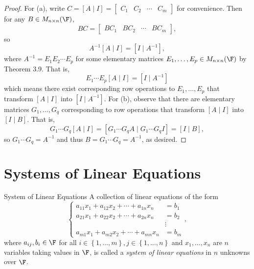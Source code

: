 \documentclass[linearalgebraI]{subfiles}
\begin{document}
    \begin{proof}
        For (a), write $C = [A\mid I] = \begin{bmatrix} C_1 & C_2 & \cdots & C_m \end{bmatrix}$ for convenience. Then for any $B\in M_{n\times n}(\F)$,
        \begin{equation*}
            BC = 
            \begin{bmatrix}
                BC_1 & BC_2 & \cdots & BC_m
            \end{bmatrix},
        \end{equation*}
        so
        \begin{equation*}
            A^{-1}[A\mid I] = [I\mid A^{-1}],
        \end{equation*}
        where $A^{-1} = E_1E_2\cdots E_p$ for some elementary matrices $E_1, \ldots, E_p\in M_{n\times n}(\F)$ by Theorem 3.9. That is,
        \begin{equation*}
            E_1\cdots E_p [A\mid I] = [I\mid A^{-1}]
        \end{equation*}
        which means there exist corresponding row operations to $E_1, \ldots, E_p$ that transform $[A\mid I]$ into $[I\mid A^{-1}]$. For (b), observe that there are elementary matrices $G_1, \ldots, G_q$ corresponding to row operations that transform $[A\mid I]$ into $[I\mid B]$. That is,
        \begin{equation*}
            G_1\cdots G_q [A\mid I] = [G_1\cdots G_qA\mid G_1\cdots G_qI] = [I\mid B],
        \end{equation*}
        so $G_1\cdots G_q = A^{-1}$ and thus $B = G_1\cdots G_q = A^{-1}$, as desired.
    \end{proof}

    \section{Systems of Linear Equations}

    \begin{definition}{System of Linear Equations}{}
        A collection of linear equations of the form
        \begin{equation*}
            \begin{cases}
                a_{11}x_1 + a_{12}x_2 + \cdots + a_{1n}x_n & = b_1 \\
                a_{21}x_1 + a_{22}x_2 + \cdots + a_{2n}x_n & = b_2 \\
                                                           & \vdots \\
                a_{m1}x_1 + a_{m2}x_2 + \cdots + a_{mn}x_n & = b_m
            \end{cases},
        \end{equation*}
        where $a_{ij}, b_i\in \F$ for all $i\in \left\lbrace 1, \ldots, m \right\rbrace, j\in \left\lbrace 1, \ldots, n \right\rbrace$ and $x_1, \ldots, x_n$ are $n$ variables taking values in $\F$, is called a \emph{system of linear equations} in $n$ unknowns over $\F$.
    \end{definition}
\end{document}
